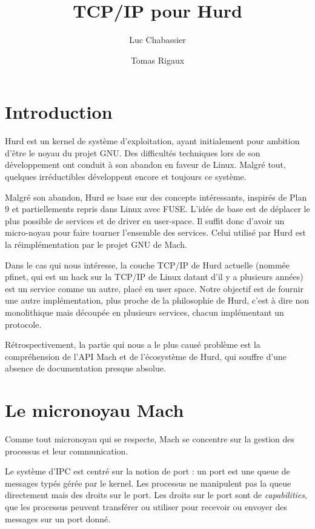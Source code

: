 \documentclass{article}
\title{TCP/IP pour Hurd}
\author{Luc Chabassier \and Tomas Rigaux}
\begin{document}
\maketitle

\section{Introduction}
Hurd est un kernel de système d'exploitation, ayant initialement pour ambition
d'être le noyau du projet GNU. Des difficultés techniques lors de son développement
ont conduit à son abandon en faveur de Linux. Malgré tout, quelques irréductibles
développent encore et toujours ce système.

Malgré son abandon, Hurd se base sur des concepts intéressants, inspirés de Plan 9
et partiellements repris dans Linux avec FUSE. L'idée de base est de déplacer
le plus possible de services et de driver en user-space. Il suffit donc
d'avoir un micro-noyau pour faire tourner l'ensemble des services. Celui utilisé
par Hurd est la réimplémentation par le projet GNU de Mach.

Dans le cas qui nous intéresse, la couche TCP/IP de Hurd actuelle (nommée pfinet,
qui est un hack sur la TCP/IP de Linux datant d'il y a plusieurs années) est un
service comme un autre, placé en user space. Notre objectif est de fournir une
autre implémentation, plus proche de la philosophie de Hurd, c'est à dire non
monolithique mais découpée en plusieurs services, chacun implémentant un
protocole.

Rétrospectivement, la partie qui nous a le plus causé problème est la compréhension
de l'API Mach et de l'écosystème de Hurd, qui souffre d'une absence de documentation
presque absolue.

\section{Le micronoyau Mach}

Comme tout micronoyau qui se respecte, Mach se concentre sur la gestion des processus
et leur communication.

Le système d'IPC est centré sur la notion de port : un port est une queue de messages
typés gérée par le kernel. Les processus ne manipulent pas la queue directement mais
des droits sur le port. Les droits sur le port sont de \emph{capabilities},
que les processus peuvent transférer ou utiliser pour recevoir ou envoyer des
messages sur un port donné.
\end{document}
